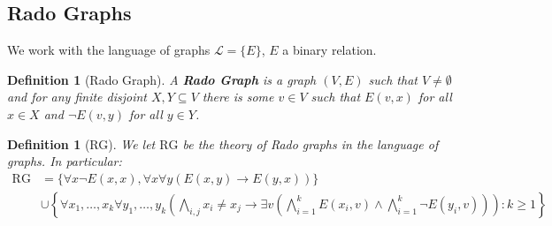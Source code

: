 \documentclass[]{article}
\theoremstyle{custhm}
\theoremstyle{cusdef}
\newtheorem{defin}[theorem]{Definition}
\theoremstyle{custhm}
\theoremstyle{custhm}
\theoremstyle{custhm}
\theoremstyle{ex}
\theoremstyle{custhm}
\theoremstyle{cusdef}
\theoremstyle{remark}
\theoremstyle{remark}
\theoremstyle{numremark}
\newcommand{\ra}{\rightarrow}
\newcommand{\undf}[1]{\textit{\textbf{#1}}}
\renewcommand{\L}{\mathcal{L}}
\newcommand{\rg}{\textrm{RG}}
\renewcommand{\subset}{\subseteq}
\begin{document}
\subsection*{Rado Graphs}

We work with the language of graphs $\L = \{E\}$, $E$ a binary relation.

\begin{defin}[Rado Graph]
A \undf{Rado Graph} is a graph $(V,E)$ such that $V\ne \emptyset$ and for any finite disjoint $X,Y\subset V$ there is some $v\in V$ such that $E(v,x)$ for all $x\in X$ and $\neg E(v,y)$ for all $y\in Y$.
\end{defin}
\begin{defin}[RG]
We let $\rg$ be the theory of Rado graphs in the language of graphs. In particular:
\begin{align*}
	\rg &= \{ \forall x \neg E(x,x),\forall x\forall y(E(x,y)\ra E(y,x)) \}\\
		&\cup \left\lbrace \forall x_1,\dots,x_k\forall y_1,\dots,y_k\left(\bigwedge_{i,j}x_i\ne x_j \ra \exists v\left(\bigwedge_{i=1}^{k}E(x_i,v) \land \bigwedge_{i=1}^{k}\neg E(y_i,v)\right)\right):k\ge 1\right\rbrace
\end{align*}
\end{defin}
\end{document}

